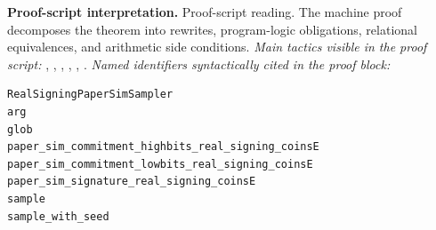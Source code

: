\begin{formaltheorem}
\noindent\textbf{Proof-script interpretation.}
Proof-script reading. The machine proof decomposes the theorem into rewrites, program-logic obligations, relational equivalences, and arithmetic side conditions.
\emph{Main tactics visible in the proof script:} , , , , , .
\emph{Named identifiers syntactically cited in the proof block:}
\begin{lstlisting}[language=EasyCrypt,basicstyle=\ttfamily\scriptsize]
RealSigningPaperSimSampler
arg
glob
paper_sim_commitment_highbits_real_signing_coinsE
paper_sim_commitment_lowbits_real_signing_coinsE
paper_sim_signature_real_signing_coinsE
sample
sample_with_seed
\end{lstlisting}

\end{formaltheorem}

